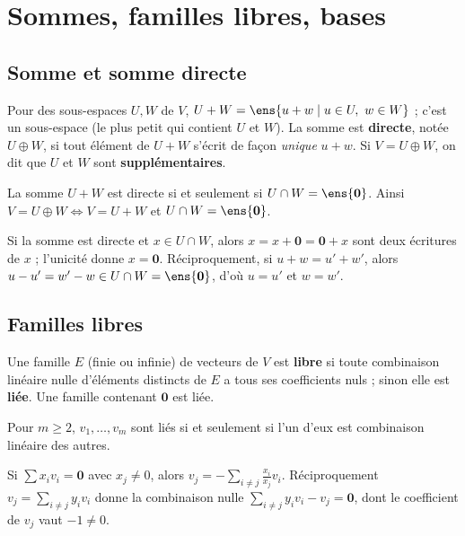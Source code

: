 \section{Sommes, familles libres, bases}
\subsection{Somme et somme directe}
\begin{definition}
Pour des sous-espaces $U,W$ de $V$, $U+W=\ens{u+w\mid u\in U,\ w\in W}$ ; c'est un sous-espace (le plus petit qui contient $U$ et $W$). La somme est \textbf{directe}, notée $U\oplus W$, si tout élément de $U+W$ s'écrit de façon \emph{unique} $u+w$. Si $V=U\oplus W$, on dit que $U$ et $W$ sont \textbf{supplémentaires}.
\end{definition}
\begin{theoreme}\label{thm-somme-directe}
La somme $U+W$ est directe si et seulement si $U\cap W=\ens{\mathbf 0}$. Ainsi $V=U\oplus W\iff V=U+W$ et $U\cap W=\ens{\mathbf 0}$.
\end{theoreme}
\begin{preuve}
Si la somme est directe et $x\in U\cap W$, alors $x=x+\mathbf 0=\mathbf 0+x$ sont deux écritures de $x$ ; l'unicité donne $x=\mathbf 0$. Réciproquement, si $u+w=u'+w'$, alors $u-u'=w'-w\in U\cap W=\ens{\mathbf 0}$, d'où $u=u'$ et $w=w'$.
\end{preuve}
\subsection{Familles libres}
\begin{definition}
Une famille $E$ (finie ou infinie) de vecteurs de $V$ est \textbf{libre} si toute combinaison linéaire nulle d'éléments distincts de $E$ a tous ses coefficients nuls ; sinon elle est \textbf{liée}. Une famille contenant $\mathbf 0$ est liée.
\end{definition}
\begin{proposition}\label{prop-liee}
Pour $m\ge2$, $v_1,\dots,v_m$ sont liés si et seulement si l'un d'eux est combinaison linéaire des autres.
\end{proposition}
\begin{preuve}
Si $\sum x_iv_i=\mathbf 0$ avec $x_j\neq0$, alors $v_j=-\sum_{i\neq j}\frac{x_i}{x_j}v_i$. Réciproquement $v_j=\sum_{i\neq j}y_iv_i$ donne la combinaison nulle $\sum_{i\neq j}y_iv_i-v_j=\mathbf 0$, dont le coefficient de $v_j$ vaut $-1\neq0$.
\end{preuve}
